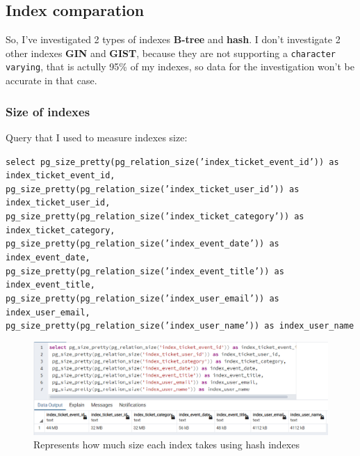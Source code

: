 \subsection{Index comparation}\label{subsec:index-comparation}

So, I've investigated 2 types of indexes \textbf{B-tree} and \textbf{hash}.
I don't investigate 2 other indexes \textbf{GIN} and \textbf{GIST}, because they are not supporting a
\texttt{character varying}, that is actully 95\% of my indexes, so data for the investigation won't be accurate
in that case.

\subsubsection{Size of indexes}

Query that I used to measure indexes size:

\texttt{select pg\_size\_pretty(pg\_relation\_size('index\_ticket\_event\_id')) as index\_ticket\_event\_id,\\
pg\_size\_pretty(pg\_relation\_size('index\_ticket\_user\_id')) as index\_ticket\_user\_id,\\
pg\_size\_pretty(pg\_relation\_size('index\_ticket\_category')) as index\_ticket\_category,\\
pg\_size\_pretty(pg\_relation\_size('index\_event\_date')) as index\_event\_date,\\
pg\_size\_pretty(pg\_relation\_size('index\_event\_title')) as index\_event\_title,\\
pg\_size\_pretty(pg\_relation\_size('index\_user\_email')) as index\_user\_email,\\
pg\_size\_pretty(pg\_relation\_size('index\_user\_name')) as index\_user\_name \\
}

\begin{figure}[h]
    \centering
    \label{fig:hash_index_size}
    \includegraphics[width=1\textwidth]{images/index_size_hash}
    \caption{Represents how much size each index takes using hash indexes}
\end{figure}

